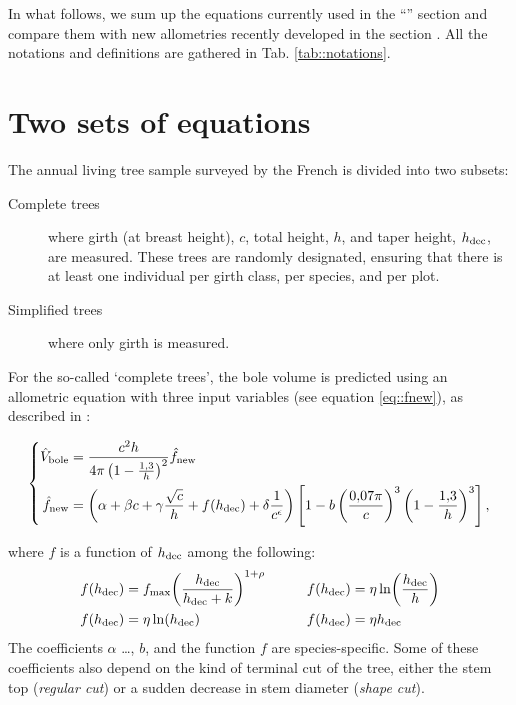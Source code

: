 In what follows, we sum up the equations currently used in the ``'' section and compare them with new allometries recently developed \parencite{Gohon2024} in the section . All the notations and definitions are gathered in Tab. \ref{tab::notations}.

\section{Two sets of equations\label{sec::old_allom}}

The annual living tree sample surveyed by the French \NFI{} is divided into two subsets:
\begin{description}
	\item [Complete trees] where girth (at breast height), \( c \), total height, \( h \), and taper height, \( h_{\text{dec}} \), are measured. These trees are randomly designated, ensuring that there is at least one individual per girth class, per species, and per plot.
	\item [Simplified trees] where only girth is measured.
\end{description}

For the so-called `complete trees', the bole volume is predicted using an allometric equation with three input variables (see equation \eqref{eq::fnew}), as described in \cite{Morneau2016}:
\begin{fullwidth}
	\begin{equation}
		\left\{
		\begin{aligned}
			\hat{V}_{\text{bole}} &= \frac{c^2 h}{4 \pi \left( 1 - \frac{1{,}3}{h} \right)^2} \hat f_{\text{new}} \\
			\hat f_{\text{new}} &= \left( \alpha + \beta c + \gamma \frac{\sqrt{c}}{h} + f(h_{\text{dec}}) + \delta \frac{1}{c^\epsilon} \right) \left[ 1 - b \left( \frac{0{,}07 \pi}{c} \right)^3 \left( 1 - \frac{1{,}3}{h} \right)^3 \right],
		\end{aligned}
		\right.
		\label{eq::fnew}
	\end{equation}
\end{fullwidth}
where \( f \) is a function of \( h_{\text{dec}} \) among the following:
\begin{alignat*}{2}
f(h_{\text{dec}}) & = f_{\text{max}}\!\left( \frac{h_{\text{dec}}}{h_{\text{dec}} + k} \right)^{1 + \rho} && \qquad f(h_{\text{dec}}) = \eta \ln\!\left( \frac{h_{\text{dec}}}{h} \right) \\
f(h_{\text{dec}}) & = \eta \ln(h_{\text{dec}}) && \qquad f(h_{\text{dec}}) = \eta h_{\text{dec}}
\end{alignat*}
The coefficients \( \alpha \) \dots, \( b \), and the function \( f \) are species-specific. Some of these coefficients also depend on the kind of terminal cut of the tree, either the stem top (\textit{regular cut}) or a sudden decrease in stem diameter (\textit{shape cut}). \\

